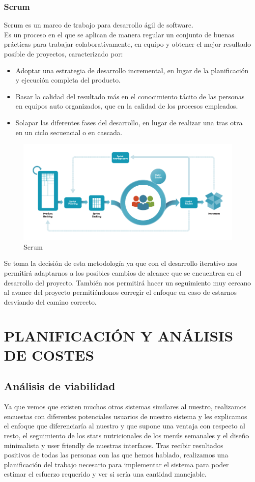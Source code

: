 \documentclass[12pt, a4paper, twoside]{book}
\begin{document}
	\subsection{Scrum}
	Scrum es un marco de trabajo para desarrollo ágil de software.\\
	Es un proceso en el que se aplican de manera regular un conjunto de buenas prácticas para trabajar colaborativamente, en equipo y obtener el mejor resultado posible de proyectos, caracterizado por:
	\begin{itemize}
		\item Adoptar una estrategia de desarrollo incremental, en lugar de la planificación y ejecución completa del producto.
		\item Basar la calidad del resultado más en el conocimiento tácito de las personas en equipos auto organizados, que en la calidad de los procesos empleados.
		\item Solapar las diferentes fases del desarrollo, en lugar de realizar una tras otra en un ciclo secuencial o en cascada.
	\end{itemize}	
	\begin{figure}[H]
		\centering
		\includegraphics[width=15cm]{Imagenes/Scrum.png}
		\caption{Scrum}\label{Scrum}
	\end{figure}
	Se toma la decisión de esta metodología ya que con el desarrollo iterativo nos permitirá adaptarnos a los posibles cambios de alcance que se encuentren en el desarrollo del proyecto. También nos permitirá hacer un seguimiento muy cercano al avance del proyecto permitiéndonos corregir el enfoque en caso de estarnos desviando del camino correcto.
	\chapter{PLANIFICACIÓN Y ANÁLISIS DE COSTES}
	\section{Análisis de viabilidad}
	Ya que vemos que existen muchos otros sistemas similares al nuestro, realizamos encuestas con diferentes potenciales usuarios de nuestro sistema y les explicamos el enfoque que diferenciaría al nuestro y que supone una ventaja con respecto al resto, el seguimiento de los stats nutricionales de los menús semanales y el diseño minimalista y user friendly de nuestras interfaces. Tras recibir resultados positivos de todas las personas con las que hemos hablado, realizamos una planificación del trabajo necesario para implementar el sistema para poder estimar el esfuerzo requerido y ver si sería una cantidad manejable.
\end{document}
